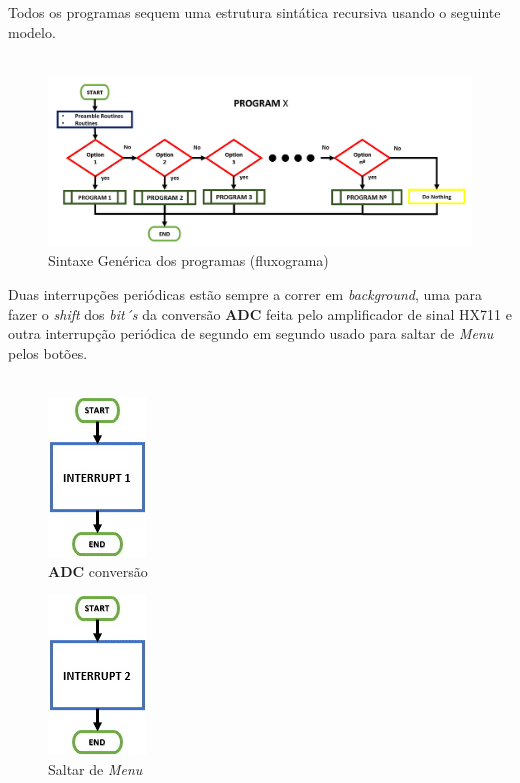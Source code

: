 Todos os programas sequem uma estrutura sintática recursiva usando o seguinte modelo.
\\
\\
\begin{figure}[H]
	\centering
	\includegraphics[scale=0.40]{./image/PESTA/flowchart/Generic_structure.jpg}
	\caption{Sintaxe Genérica dos programas (fluxograma)}
	\label{Geneic_structure}
\end{figure}
Duas interrupções periódicas estão sempre a correr em \textit{background}, uma para fazer o \textit{shift} dos \textit{bit´s} da conversão \textbf{ADC} feita pelo amplificador de sinal HX711 e outra interrupção periódica de segundo em segundo usado para saltar de \textit{Menu} pelos botões.
\\
\\
\begin{minipage}{\linewidth}
\begin{minipage}{.5\linewidth}
\begin{figure}[H]
	\centering
	\includegraphics[scale=0.7]{./image/PESTA/flowchart/Interrupt_1.jpg}
	\caption{\textbf{ADC} conversão}
	\label{Interrupt_1}
\end{figure}
\end{minipage}
\begin{minipage}{.5\linewidth}
\begin{figure}[H]
	\centering
	\includegraphics[scale=0.7]{./image/PESTA/flowchart/Interrupt_2.jpg}
	\caption{Saltar de \textit{Menu}}
	\label{Interrupt_2}
\end{figure}
\end{minipage}
\end{minipage}
